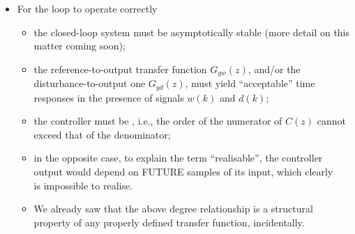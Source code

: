 \begin{frame}
\myPause
 \begin{itemize}[<+-| alert@+>]
 \item For the loop to operate correctly
       \begin{itemize}[<+-| alert@+>]
       \item the closed-loop system must be asymptotically stable (more detail on this matter coming soon);
       \item the reference-to-output transfer function $G_{yw}(z)$, and/or the disturbance-to-output one $G_{yd}(z)$,
             must yield ``acceptable'' time responses in the presence of  signals $w(k)$ and $d(k)$;
       \item the controller must be , i.e., the order of the numerator of $C(z)$ cannot exceed
             that of the denominator;
       \item in the opposite case, to explain the term ``realisable'', the controller\\
             output would depend on FUTURE samples of its input, which clearly\\ 
             is impossible to realise.
       \item We already saw that the above degree relationship is a structural\\
             property of any properly defined transfer function, incidentally.
       \end{itemize}
 \end{itemize}
\end{frame}

